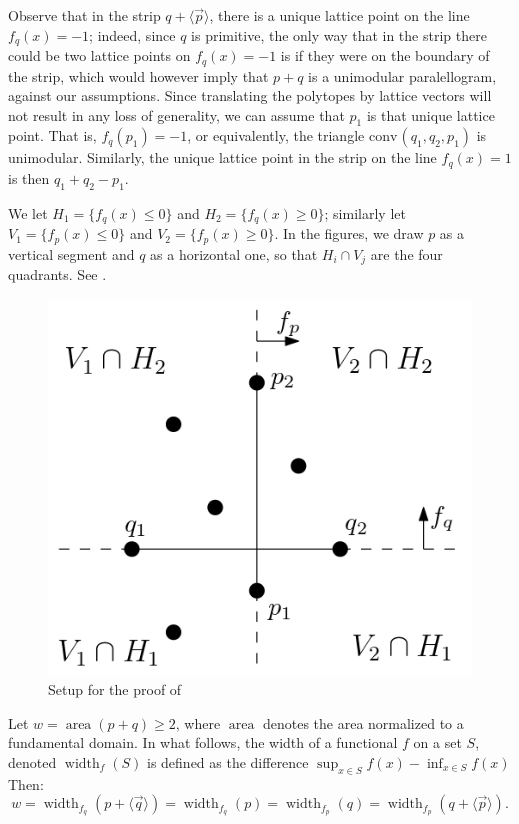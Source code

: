 \documentclass{amsart}
\theoremstyle{plain}
\theoremstyle{definition}
\newcommand{\width}{\operatorname{width}}
\newcommand{\area}{\operatorname{area}}
\renewcommand{\vec}[1]{\overrightarrow#1}
\newcommand{\vecline}[1]{\langle \vec #1 \rangle}
\newcommand{\conv}{\ensuremath{\mathrm{conv}}\hspace{1pt}}
\begin{document}
Observe that in the strip $q +\vecline p$, there is a unique lattice point on the line $f_q(x)=-1$;  indeed, since $q$ is primitive, the only way that in the strip there could be two lattice points on $f_q(x)=-1$ is if they were on the boundary of the strip, which would however imply that $p+q$ is a unimodular paralellogram, against our assumptions.
Since translating the polytopes by lattice vectors will not result in any loss of generality, we can assume that $p_1$ is that unique lattice point. That is, $f_q(p_1)=-1$, or equivalently, the triangle $\conv(q_1, q_2, p_1)$ is unimodular. Similarly, the unique lattice point in the strip on the line $f_q(x)=1$ is then $q_1+q_2 -p_1$.

We let $H_1=\{f_q(x) \leq 0\}$ and $H_2=\{f_q(x) \geq 0\}$; similarly let $V_1=\{f_p(x) \leq 0\}$ and $V_2=\{f_p(x) \geq 0\}$. 
In the figures, we draw $p$ as a vertical segment and $q$ as a horizontal one, so that $H_i \cap V_j$ are the four quadrants. 
See .
%
\begin{figure}[htb]
\includegraphics[scale=.3]{setup.png}
\caption{Setup for the proof of }
\label{fig:setup}
\end{figure}

Let $w=\area(p+q) \geq 2$, where $\area$ denotes the area normalized to a fundamental domain. In what follows, the width of a functional $f$ on a set $S$, denoted $\width_f(S)$ is defined as the difference $\sup_{x\in S} f(x)-\inf_{x\in S} f(x)$
Then:
\[
w=\width_{f_q}(p + \vecline q )=\width_{f_q}(p)=\width_{f_p}(q)=\width_{f_p}(q +\vecline p ). 
\] 
\end{document}
